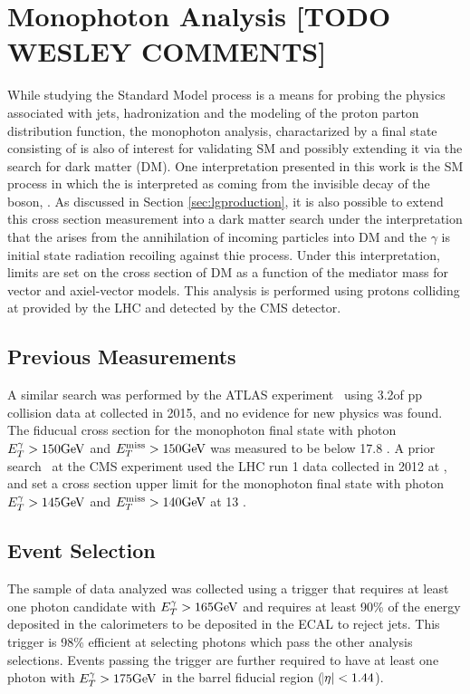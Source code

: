 
\chapter{Monophoton Analysis [TODO WESLEY COMMENTS] }\label{sec:lgxc}

While studying the Standard Model process \ppwbb is a means
 for probing the physics associated with jets,
 hadronization and the modeling of the proton 
 parton distribution function, the monophoton analysis,
 charactarized by a final state consisting of \gmet 
 is also of interest for validating SM and possibly extending it
 via the search for dark matter (DM).
One interpretation presented in this work
 is the SM process \ppzgnng  in which the \met is interpreted as coming from the
 invisible decay of the \z boson, \znn.
As discussed in Section \ref{sec:lgproduction},
 it is also possible to extend this cross section measurement
 into a dark matter search under the interpretation 
 that the \met arises from the 
 annihilation of incoming particles into DM 
 and the $\gamma$ is initial state radiation 
 recoiling against thie process. 
Under this interpretation, limits are set on the
 cross section of DM as a function of the 
 mediator mass for vector and axiel-vector models. 
This analysis is performed using protons colliding at
  \TeV provided by the LHC and detected by
 the CMS detector.

\section{Previous Measurements}

A similar search was performed by the ATLAS experiment~\cite{Aaboud:2016uro}
 using 3.2\fbinv of pp collision data at  \TeV
 collected in 2015, and no evidence for new physics was found. 
The fiducual cross section for 
 the monophoton final state with photon $E_T^\gamma > 150 \mathrm{GeV}$
 and $E_T^{\mathrm{miss}} > 150 \mathrm{GeV}$ was measured to be below 17.8 \fbinv.
A prior search~\cite{Khachatryan:2014rwa} at the CMS 
 experiment used the LHC run 1 data collected in 2012 at
  \TeV, and set a cross section upper limit for the monophoton final
 state with photon $E_T^\gamma > 145\mathrm{GeV}$ and $E_T^{\mathrm{miss}} > 140\mathrm{GeV}$ at 13 \fbinv. 

\section{Event Selection}\label{subsec:lgevent_selection}

The sample of data analyzed was collected using 
 a trigger that requires at least one photon
 candidate with $E_T^\gamma > 165 \mathrm{GeV}$ and 
 requires at least 90\% of the energy deposited in 
 the calorimeters to be deposited in the ECAL
 to reject jets. 
This trigger is 98\% efficient at selecting photons
 which pass the other analysis selections.
Events passing the trigger are further required to
 have at least one photon with $E_T^\gamma > 175\mathrm{GeV}$
 in the barrel fiducial region ($\abs{\eta} < 1.44$).

